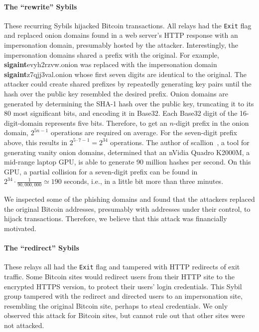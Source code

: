 \paragraph{The ``rewrite'' Sybils}
These recurring Sybils hijacked Bitcoin transactions.  All
relays had the \texttt{Exit} flag and replaced onion domains found in a web
server's HTTP response with an impersonation domain, presumably hosted by the
attacker.  Interestingly, the impersonation domains shared a prefix with the
original.  For example, \textbf{sigaint}evyh2rzvw.onion was replaced with the
impersonation domain \textbf{sigaint}z7qjj3val.onion whose first seven digits
are identical to the original.  The attacker could create shared prefixes by
repeatedly generating key pairs until the hash over the public key resembled the
desired prefix.  Onion domains are generated by determining the SHA-1 hash over
the public key, truncating it to its 80 most significant bits, and encoding it
in Base32.  Each Base32 digit of the 16-digit-domain represents five bits.
Therefore, to get an $n$-digit prefix in the onion domain, $2^{5 n - 1}$
operations are required on average.  For the seven-digit prefix above, this
results in $2^{5 \cdot 7 - 1} = 2^{34}$ operations.  The author of
scallion~\cite{scallion}, a tool for generating vanity onion domains, determined
that an nVidia Quadro K2000M, a mid-range laptop GPU, is able to generate 90
million hashes per second.  On this GPU, a partial collision for a seven-digit
prefix can be found in $2^{34} \cdot \frac{1}{90,000,000} \simeq 190$ seconds,
i.e., in a little bit more than three minutes.

We inspected some of the phishing domains and found that the attackers replaced
the original Bitcoin addresses, presumably with addresses under their control,
to hijack transactions.  Therefore, we believe that this attack was financially
motivated.

\paragraph{The ``redirect'' Sybils}
These relays all had the \texttt{Exit} flag and tampered with HTTP redirects of
exit traffic.  Some Bitcoin sites would redirect users from their HTTP site to
the encrypted HTTPS version, to protect their users' login credentials.  This
Sybil group tampered with the redirect and directed users to an impersonation
site, resembling the original Bitcoin site, perhaps to steal credentials.  We
only observed this attack for Bitcoin sites, but cannot rule out that other
sites were not attacked.

